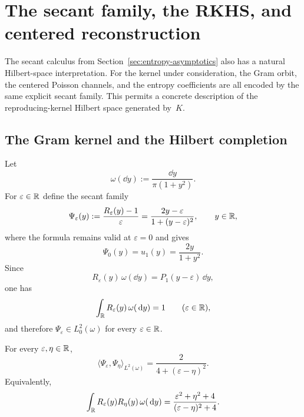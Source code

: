 \section{The secant family, the RKHS, and centered reconstruction}%
\label{sec:gram-space}

The secant calculus from Section~\ref{sec:entropy-asymptotics} also has
a natural Hilbert-space interpretation.  For the kernel under
consideration, the Gram orbit, the centered Poisson channels, and the
entropy coefficients are all encoded by the same explicit secant
family.  This permits a concrete description of the reproducing-kernel
Hilbert space generated by~$K$.

\subsection{The Gram kernel and the Hilbert completion}

Let
\[
\omega(\dd y):=\frac{\dd y}{\pi(1+y^2)}.
\]
For $\varepsilon\in\mathbb{R}$ define the secant family
\begin{equation}\label{eq:mode-secant-family}
\Psi_\varepsilon(y):=\frac{R_\varepsilon(y)-1}{\varepsilon}
=\frac{2y-\varepsilon}{1+(y-\varepsilon)^2},
\qquad y\in\mathbb{R},
\end{equation}
where the formula remains valid at $\varepsilon=0$ and gives
\[
\Psi_0(y)=u_1(y)=\frac{2y}{1+y^2}.
\]
Since
\[
R_\varepsilon(y)\,\omega(\dd y)=P_1(y-\varepsilon)\,\dd y,
\]
one has
\[
\int_{\mathbb{R}}R_\varepsilon(y)\,\omega(\,\mathrm{d} y)=1
\qquad(\varepsilon\in\mathbb{R}),
\]
and therefore $\Psi_\varepsilon\in L^2_0(\omega)$ for every
$\varepsilon\in\mathbb{R}$.

\begin{theorem}%
\label{thm:mode-gram-kernel}
For every $\varepsilon,\eta\in\mathbb{R}$,
\begin{equation}\label{eq:mode-gram-kernel}
\langle \Psi_\varepsilon,\Psi_\eta\rangle_{L^2(\omega)}
=\frac{2}{4+(\varepsilon-\eta)^2}.
\end{equation}
Equivalently,
\begin{equation}\label{eq:mode-gram-RR}
\int_{\mathbb{R}}R_\varepsilon(y)R_\eta(y)\,\omega(\,\mathrm{d} y)
=\frac{\varepsilon^2+\eta^2+4}{(\varepsilon-\eta)^2+4}.
\end{equation}
\end{theorem}

